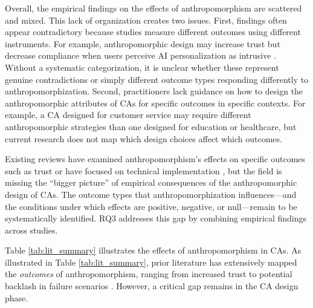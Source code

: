 \documentclass[manuscript,anonymous,sigconf]{acmart}
\begin{document}
Overall, the empirical findings on the effects of anthropomorphism are scattered and mixed. This lack of organization creates two issues. First, findings often appear contradictory because studies measure different outcomes using different instruments. For example, anthropomorphic design may increase trust \citep{go2019humanizing,konya2023anthropomorphism} but decrease compliance when users perceive AI personalization as intrusive \citep{chen_you_2021}. Without a systematic categorization, it is unclear whether these represent genuine contradictions or simply different outcome types responding differently to anthropomorphization. Second, practitioners lack guidance on how to design the anthropomorphic attributes of CAs for specific outcomes in specific contexts. For example, a CA designed for customer service may require different anthropomorphic strategies than one designed for education or healthcare, but current research does not map which design choices affect which outcomes.

Existing reviews have examined anthropomorphism's effects on specific outcomes such as trust \citep{bach2024systematic} or have focused on technical implementation \citep{chen2024trends}, but the field is missing the ``bigger picture'' of empirical consequences of the anthropomorphic design of CAs. The outcome types that anthropomorphization influences---and the conditions under which effects are positive, negative, or null---remain to be systematically identified. RQ3 addresses this gap by combining empirical findings across studies.

Table \ref{tab:lit_summary} illustrates the effects of anthropomorphism in CAs. %
As illustrated in Table \ref{tab:lit_summary}, prior literature has extensively mapped the \textit{outcomes} of anthropomorphism, ranging from increased trust \citep{go2019humanizing} to potential backlash in failure scenarios \citep{crolic2022blame}. However, a critical gap remains in the CA design phase. 
\end{document}
